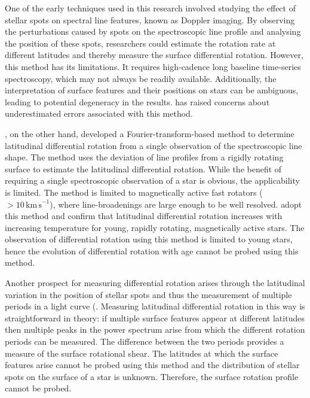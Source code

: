One of the early techniques used in this research involved studying the effect of stellar spots on spectral line features, known as Doppler imaging. 
By observing the perturbations caused by spots on the spectroscopic line profile and analysing the position of these spots, researchers could estimate the rotation rate at different latitudes and thereby measure the surface differential rotation. However, this method has its limitations. It requires high-cadence long baseline time-series spectroscopy, which may not always be readily available. Additionally, the interpretation of surface features and their positions on stars can be ambiguous, leading to potential degeneracy in the results. 
\citet{collier_differential_2007} has raised concerns about underestimated errors associated with this method.

\citet{reiners_rotation_2002}, on the other hand, developed a Fourier-transform-based method to determine latitudinal differential rotation from a single observation of the spectroscopic line shape.
The method uses the deviation of line profiles from a rigidly rotating surface to estimate the latitudinal differential rotation.
While the benefit of requiring a single spectroscopic observation of a star is obvious, the applicability is limited.
The method is limited to magnetically active fast rotators (\vsini\ $> 10\,\mathrm{km\,s}^{-1}$), where line-broadenings are large enough to be well resolved.
\citet{barnes_dependence_2005, reiners_rotation_2002} adopt this method and confirm that latitudinal differential rotation increases with increasing temperature for young, rapidly rotating, magnetically active stars.
The observation of differential rotation using this method is limited to young stars, hence the evolution of differential rotation with age cannot be probed using this method.

Another prospect for measuring differential rotation arises through the latitudinal variation in the position of stellar spots and thus the measurement of multiple periods in a light curve (\citep[see, e.g.,][]{walcowicz_rotation_2013, reinhold_rotation_2013}.
Measuring latitudinal differential rotation in this way is straightforward in theory: if multiple surface features appear at different latitudes then multiple peaks in the power spectrum arise from which the different rotation periods can be measured.
The difference between the two periods provides a measure of the surface rotational shear.
The latitudes at which the surface features arise cannot be probed using this method and the distribution of stellar spots on the surface of a star is unknown.
Therefore, the surface rotation profile cannot be probed.

